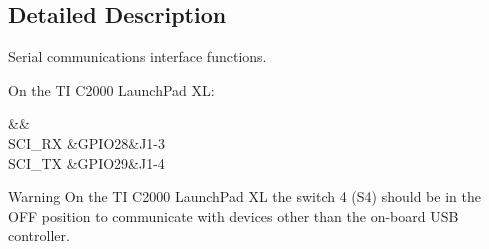 \subsection{Detailed Description}
Serial communications interface functions. \begin{DoxyParagraph}{}
On the T\-I C2000 Launch\-Pad X\-L\-: \begin{TabularC}{3}
\hline
{}\PBS{}&\PBS{}&\PBS{}\\
\PBS\centering S\-C\-I\-\_\-\-R\-X &\PBS\centering G\-P\-I\-O28&\PBS\centering J1-\/3 \\
\PBS\centering S\-C\-I\-\_\-\-T\-X &\PBS\centering G\-P\-I\-O29&\PBS\centering J1-\/4 \\
\end{TabularC}

\end{DoxyParagraph}
\begin{DoxyWarning}{Warning}
On the T\-I C2000 Launch\-Pad X\-L the switch 4 (S4) should be in the O\-F\-F position to communicate with devices other than the on-\/board U\-S\-B controller. 
\end{DoxyWarning}


